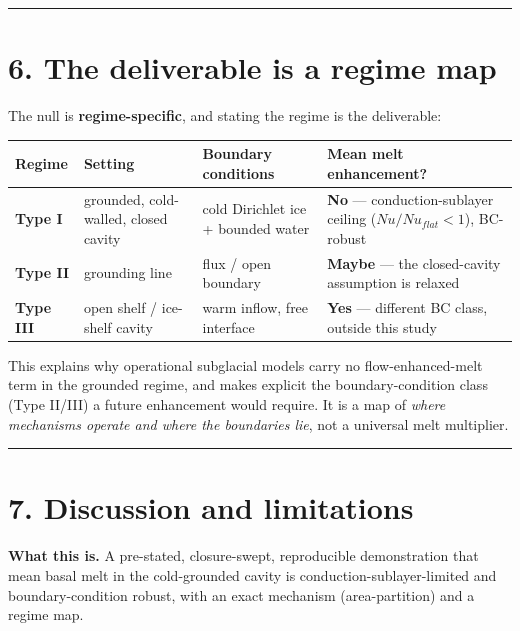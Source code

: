 \documentclass[11pt]{article}
\begin{document}
\medskip\hrule\medskip


\section*{6. The deliverable is a regime map}


The null is \textbf{regime-specific}, and stating the regime is the deliverable:


\begin{center}\small
\begin{tabularx}{\linewidth}{>{\raggedright\arraybackslash}X>{\raggedright\arraybackslash}X>{\raggedright\arraybackslash}X>{\raggedright\arraybackslash}X}
\toprule
Regime & Setting & Boundary conditions & Mean melt enhancement? \\
\midrule
\textbf{Type I} & grounded, cold-walled, closed cavity & cold Dirichlet ice + bounded water & \textbf{No} — conduction-sublayer ceiling ($Nu/Nu_{flat}<1$), BC-robust \\
\textbf{Type II} & grounding line & flux / open boundary & \textbf{Maybe} — the closed-cavity assumption is relaxed \\
\textbf{Type III} & open shelf / ice-shelf cavity & warm inflow, free interface & \textbf{Yes} — different BC class, outside this study \\
\bottomrule
\end{tabularx}
\end{center}


This explains why operational subglacial models carry no flow-enhanced-melt term in the grounded regime, and makes explicit the boundary-condition class (Type II/III) a future enhancement would require. It is a map of \emph{where mechanisms operate and where the boundaries lie}, not a universal melt multiplier.


\medskip\hrule\medskip


\section*{7. Discussion and limitations}


\textbf{What this is.} A pre-stated, closure-swept, reproducible demonstration that mean basal melt in the cold-grounded cavity is conduction-sublayer-limited and boundary-condition robust, with an exact mechanism (area-partition) and a regime map.
\end{document}

